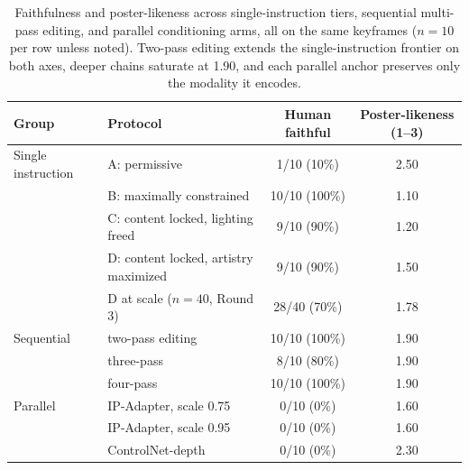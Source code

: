\begin{table}[t]
\centering
\small
\begin{tabular}{llcc}
\toprule
Group & Protocol & Human faithful & Poster-likeness (1--3) \\
\midrule
Single instruction & A: permissive & 1/10 (10\%) & 2.50 \\
 & B: maximally constrained & 10/10 (100\%) & 1.10 \\
 & C: content locked, lighting freed & 9/10 (90\%) & 1.20 \\
 & D: content locked, artistry maximized & 9/10 (90\%) & 1.50 \\
 & D at scale ($n=40$, Round 3) & 28/40 (70\%) & 1.78 \\
\midrule
Sequential & two-pass editing & 10/10 (100\%) & 1.90 \\
 & three-pass & 8/10 (80\%) & 1.90 \\
 & four-pass & 10/10 (100\%) & 1.90 \\
\midrule
Parallel & IP-Adapter, scale 0.75 & 0/10 (0\%) & 1.60 \\
 & IP-Adapter, scale 0.95 & 0/10 (0\%) & 1.60 \\
 & ControlNet-depth & 0/10 (0\%) & 2.30 \\
\bottomrule
\end{tabular}
\caption{Faithfulness and poster-likeness across single-instruction tiers, sequential multi-pass editing, and parallel conditioning arms, all on the same keyframes ($n=10$ per row unless noted). Two-pass editing extends the single-instruction frontier on both axes, deeper chains saturate at 1.90, and each parallel anchor preserves only the modality it encodes.}
\label{tab:frontier}
\end{table}

